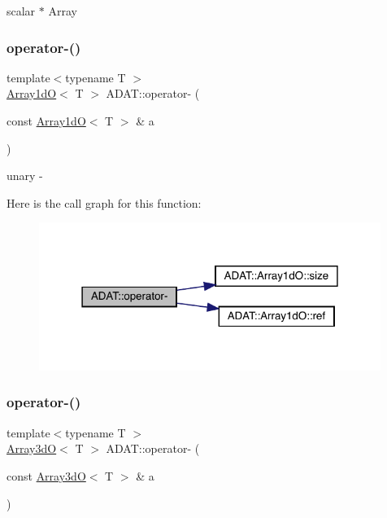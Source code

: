 scalar $\ast$ Array 

\mbox{\label{namespaceADAT_a38346a215cc728771b946bbdaa59e62f}} 
\subsubsection{\texorpdfstring{operator-\/()}{operator-()}\hspace{0.1cm}{\footnotesize\ttfamily [1/2]}}
{\footnotesize\ttfamily template$<$typename T $>$ \\
\mbox{\hyperlink{classADAT_1_1Array1dO}{Array1dO}}$<$ T $>$ A\+D\+A\+T\+::operator-\/ (\begin{DoxyParamCaption}\item[{const \mbox{\hyperlink{classADAT_1_1Array1dO}{Array1dO}}$<$ T $>$ \&}]{a }\end{DoxyParamCaption})\hspace{0.3cm}{\ttfamily [inline]}}



unary -\/ 

Here is the call graph for this function\+:\nopagebreak
\begin{figure}[H]
\begin{center}
\leavevmode
\includegraphics[width=315pt]{d5/d0d/namespaceADAT_a38346a215cc728771b946bbdaa59e62f_cgraph}
\end{center}
\end{figure}
\mbox{\label{namespaceADAT_a891c59cca15a986469283c3b0c8c8b9f}} 
\subsubsection{\texorpdfstring{operator-\/()}{operator-()}\hspace{0.1cm}{\footnotesize\ttfamily [2/2]}}
{\footnotesize\ttfamily template$<$typename T $>$ \\
\mbox{\hyperlink{classADAT_1_1Array3dO}{Array3dO}}$<$ T $>$ A\+D\+A\+T\+::operator-\/ (\begin{DoxyParamCaption}\item[{const \mbox{\hyperlink{classADAT_1_1Array3dO}{Array3dO}}$<$ T $>$ \&}]{a }\end{DoxyParamCaption})\hspace{0.3cm}{\ttfamily [inline]}}



